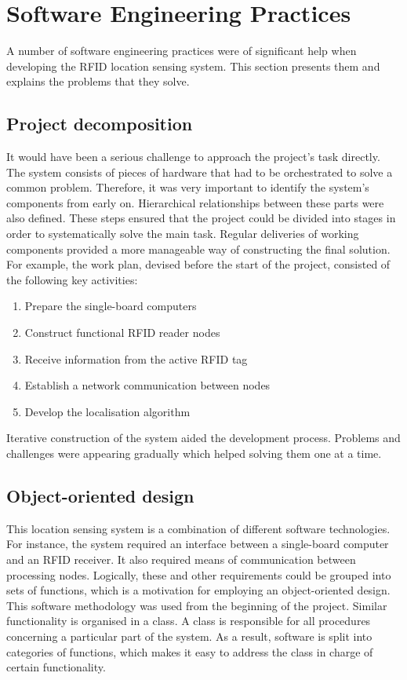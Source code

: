 \section{Software Engineering Practices}
\label{sec:softengprac}

A number of software engineering practices were of significant help when developing the RFID location sensing system. This section presents them and explains the problems that they solve.  

\subsection{Project decomposition}

It would have been a serious challenge to approach the project's task directly. The system consists of pieces of hardware that had to be orchestrated to solve a common problem. Therefore, it was very important to identify the system's components from early on. Hierarchical relationships between these parts were also defined. These steps ensured that the project could be divided into stages in order to systematically solve the main task. Regular deliveries of working components provided a more manageable way of constructing the final solution. For example, the work plan, devised before the start of the project, consisted of the following key activities:

\begin{enumerate}
 	\item Prepare the single-board computers
 	\item Construct functional RFID reader nodes
 	\item Receive information from the active RFID tag
 	\item Establish a network communication between nodes
 	\item Develop the localisation algorithm
 \end{enumerate}

Iterative construction of the system aided the development process. Problems and challenges were appearing gradually which helped solving them one at a time. 

\subsection{Object-oriented design}

This location sensing system is a combination of different software technologies. For instance, the system required an interface between a single-board computer and an RFID receiver. It also required means of communication between processing nodes. Logically, these and other requirements could be grouped into sets of functions, which is a motivation for employing an object-oriented design. This software methodology was used from the beginning of the project. Similar functionality is organised in a class. A class is responsible for all procedures concerning a particular part of the system. As a result, software is split into categories of functions, which makes it easy to address the class in charge of certain functionality.

